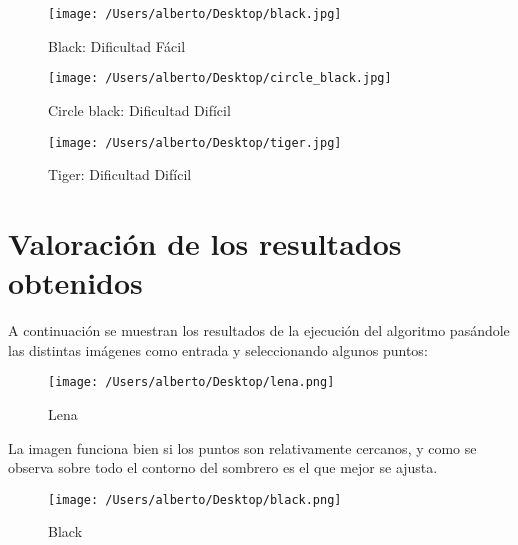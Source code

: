 \begin{figure}[H] %
\centering
\texttt{[image: /Users/alberto/Desktop/black.jpg]}  %
\label{kk1}
\caption{Black: Dificultad Fácil} 
\end{figure}

\begin{figure}[H] %
\centering
\texttt{[image: /Users/alberto/Desktop/circle\_black.jpg]}  %
\label{kk1}
\caption{Circle black: Dificultad Difícil} 
\end{figure}

\begin{figure}[H] %
\centering
\texttt{[image: /Users/alberto/Desktop/tiger.jpg]}  %
\label{kk1}
\caption{Tiger: Dificultad Difícil} 
\end{figure}

\newpage
\section{Valoración de los resultados obtenidos}

A continuación se muestran los resultados de la ejecución del algoritmo pasándole las distintas imágenes como entrada y seleccionando algunos puntos:

\begin{figure}[H] %
\centering
\texttt{[image: /Users/alberto/Desktop/lena.png]}  %
\label{kk1}
\caption{Lena} 
\end{figure}

La imagen funciona bien si los puntos son relativamente cercanos, y como se observa sobre todo el contorno del sombrero es el que mejor se ajusta.

\begin{figure}[H] %
\centering
\texttt{[image: /Users/alberto/Desktop/black.png]}  %
\label{kk1}
\caption{Black} 
\end{figure}

